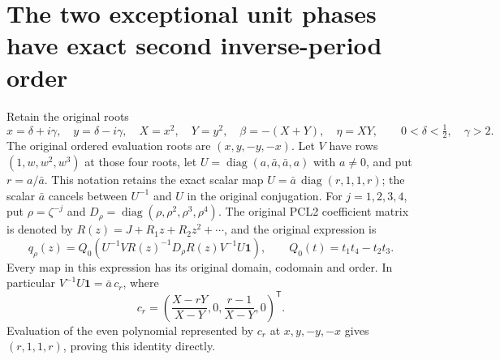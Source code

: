 
\section{The two exceptional unit phases have exact second inverse-period order}
Retain the original roots
\[
 x=\delta+i\gamma,\quad y=\delta-i\gamma,\quad
 X=x^2,\quad Y=y^2,\quad
 \beta=-(X+Y),\quad\eta=XY,
 \qquad 0<\delta<\tfrac12,\quad\gamma>2.
\]
The original ordered evaluation roots are $(x,y,-y,-x)$.
Let $V$ have rows $(1,w,w^2,w^3)$ at those four roots, let
$U=\operatorname{diag}(a,\bar a,\bar a,a)$ with $a\ne0$, and
put $r=a/\bar a$.  This notation retains the exact scalar map
$U=\bar a\,\operatorname{diag}(r,1,1,r)$; the scalar $\bar a$
cancels between $U^{-1}$ and $U$ in the original conjugation.
For $j=1,2,3,4$, put $\rho=\zeta^{-j}$ and
$D_\rho=\operatorname{diag}(\rho,\rho^2,\rho^3,\rho^4)$.
The original PCL2 coefficient matrix is denoted by
$R(z)=J+R_1z+R_2z^2+\cdots$, and the original expression is
\[
 q_\rho(z)=Q_0\left(U^{-1}VR(z)^{-1}D_\rho R(z)V^{-1}U\mathbf1\right),
 \qquad Q_0(t)=t_1t_4-t_2t_3.
\]
Every map in this expression has its original domain, codomain and order.
In particular $V^{-1}U\mathbf1=\bar a\,c_r$, where
\[
 c_r=\left(\frac{X-rY}{X-Y},0,\frac{r-1}{X-Y},0\right)^{\mathsf T}.
\]
Evaluation of the even polynomial represented by $c_r$ at
$x,y,-y,-x$ gives $(r,1,1,r)$, proving this identity directly.

